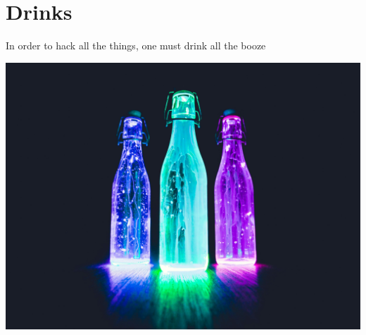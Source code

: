 \pagebreak
\chapter{Drinks}

In order to hack all the things, one must drink all the booze

\centering
\includegraphics[scale=0.1]{images/pexels-photo-274131.jpg}
